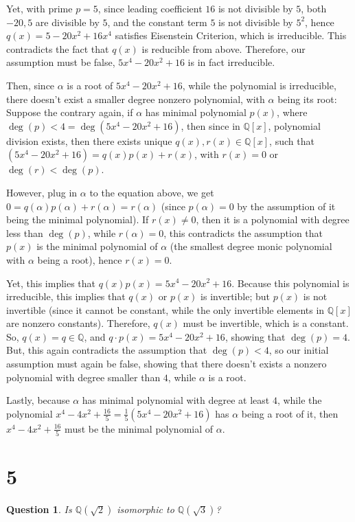 \documentclass{article}
\newtheorem{question}{Question}
\begin{document}
Yet, with prime $p=5$, since leading coefficient $16$ is not divisible by $5$, both $-20, 5$ are divisible by $5$, and the constant term $5$ is not divisible by $5^2$, hence $q(x)=5-20x^2+16x^4$ satisfies Eisenstein Criterion, which is irreducible.
This contradicts the fact that $q(x)$ is reducible from above. Therefore, our assumption must be false, $5x^4-20x^2+16$ is in fact irreducible.

\hfil

Then, since $\alpha$ is a root of $5x^4-20x^2+16$, while the polynomial is irreducible, there doesn't exist a smaller degree nonzero polynomial, with $\alpha$ being its root: Suppose the contrary again, if $\alpha$ has minimal polynomial $p(x)$, where $\deg(p)<4 = \deg(5x^4-20x^2+16)$,
then since in $\mathbb{Q}[x]$, polynomial division exists, then there exists unique $q(x),r(x)\in\mathbb{Q}[x]$, such that $(5x^4-20x^2+16)=q(x)p(x)+r(x)$, with $r(x)=0$ or $\deg(r)<\deg(p)$.

However, plug in $\alpha$ to the equation above, we get $0=q(\alpha)p(\alpha)+r(\alpha)=r(\alpha)$ (since $p(\alpha)=0$ by the assumption of it being the minimal polynomial).
If $r(x)\neq 0$, then it is a polynomial with degree less than $\deg(p)$, while $r(\alpha)=0$, this contradicts the assumption that $p(x)$ is the minimal polynomial of $\alpha$ (the smallest degree monic polynomial with $\alpha$ being a root),
hence $r(x)=0$.

Yet, this implies that $q(x)p(x)=5x^4-20x^2+16$. Because this polynomial is irreducible, this implies that $q(x)$ or $p(x)$ is invertible; but $p(x)$ is not invertible (since it cannot be constant, while the only invertible elements in $\mathbb{Q}[x]$ are nonzero constants).
Therefore, $q(x)$ must be invertible, which is a constant. So, $q(x)=q\in\mathbb{Q}$, and $q\cdot p(x)=5x^4-20x^2+16$, showing that $\deg(p)=4$.
But, this again contradicts the assumption that $\deg(p)<4$, so our initial assumption must again be false, showing that there doesn't exists a nonzero polynomial with degree smaller than $4$, while $\alpha$ is a root.

\hfil

Lastly, because $\alpha$ has minimal polynomial with degree at least $4$, while the polynomial $x^4-4x^2+\frac{16}{5}=\frac{1}{5}(5x^4-20x^2+16)$ has $\alpha$ being a root of it,
then $x^4-4x^2+\frac{16}{5}$ must be the minimal polynomial of $\alpha$.

\break

\section*{5}
\begin{myBox}[]{}
    \begin{question}
        Is $\mathbb{Q}(\sqrt{2})$ isomorphic to $\mathbb{Q}(\sqrt{3})$?
    \end{question}
\end{myBox}
\end{document}

